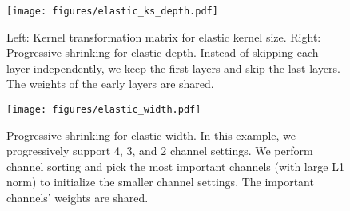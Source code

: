 \documentclass{article} \usepackage{iclr2020_conference,times}
\begin{document}
\begin{figure}[t]
    \centering
    \texttt{[image: figures/elastic\_ks\_depth.pdf]}
    \caption{Left: Kernel transformation matrix for elastic kernel size. Right: Progressive shrinking for elastic depth. Instead of skipping each layer independently, we keep the first  layers and skip the last  layers. The weights of the early layers are shared.}\label{fig:elastic_ks_depth}
\end{figure}

\begin{figure}[t]
    \centering
    \texttt{[image: figures/elastic\_width.pdf]}
    \caption{Progressive shrinking for elastic width. In this example, we progressively support 4, 3, and 2 channel settings. We perform channel sorting and pick the most important channels (with large L1 norm) to initialize the smaller channel settings. The important channels' weights are shared.}\label{fig:elastic_width}
\end{figure}
\end{document}
